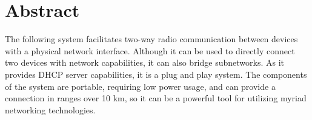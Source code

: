 

\chapter*{Abstract}

The following system facilitates two-way radio communication between devices with a physical network interface. Although it can be used to directly connect two devices with network capabilities, it can also bridge subnetworks. As it provides DHCP server capabilities, it is a plug and play system. The components of the system are portable, requiring low power usage, and can provide a connection in ranges over 10 km, so it can be a powerful tool for utilizing myriad networking technologies. 